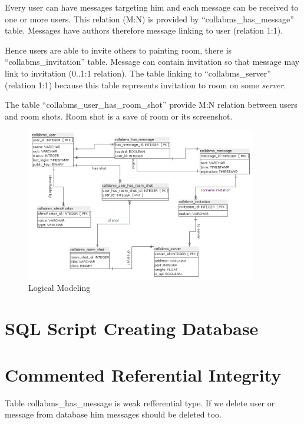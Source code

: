 \documentclass[12pt,oneside,a4paper]{article}
\begin{document}
Every user can have messages targeting him and each message can be received to one or more users. This relation (M:N) is provided by ``collabms\_{}has\_{}message'' table. Messages have authors therefore message linking to user (relation 1:1).

Hence users are able to invite others to painting room, there is ``collabms\_{}invitation'' table. Message can contain invitation so that message may link to invitation (0..1:1 relation). The table linking to ``collabms\_{}server'' (relation 1:1) because this table represents invitation to room on some  \emph{server}.

The table ``collabms\_{}user\_{}has\_{}room\_{}shot'' provide M:N relation between users and room shots. Room shot is a save of room or its screenshot.

\begin{figure}[h]
	\centering
	\includegraphics[width=0.9\textwidth]{figures/logical_model.png}
	\caption{Logical Modeling}
	\label{fig.logical_model}
\end{figure}

\newpage
\section{SQL Script Creating Database}


\newpage

\section{Commented Referential Integrity}

\noindent
Table collabms\_has\_message is weak refferential type. If we delete user or message from database him messages should be deleted too.
\end{document}
